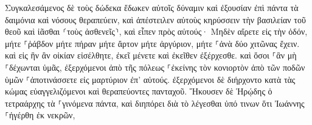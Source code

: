 \documentclass{openreader}
\begin{document}
Συγκαλεσάμενος δὲ τοὺς δώδεκα ἔδωκεν αὐτοῖς δύναμιν καὶ ἐξουσίαν ἐπὶ πάντα τὰ δαιμόνια καὶ νόσους θεραπεύειν, 
καὶ ἀπέστειλεν αὐτοὺς κηρύσσειν τὴν βασιλείαν τοῦ θεοῦ καὶ ἰᾶσθαι ⸂τοὺς ἀσθενεῖς⸃, 
καὶ εἶπεν πρὸς αὐτούς· Μηδὲν αἴρετε εἰς τὴν ὁδόν, μήτε ⸀ῥάβδον μήτε πήραν μήτε ἄρτον μήτε ἀργύριον, μήτε ⸀ἀνὰ δύο χιτῶνας ἔχειν. 
καὶ εἰς ἣν ἂν οἰκίαν εἰσέλθητε, ἐκεῖ μένετε καὶ ἐκεῖθεν ἐξέρχεσθε. 
καὶ ὅσοι ⸀ἂν μὴ ⸀δέχωνται ὑμᾶς, ἐξερχόμενοι ἀπὸ τῆς πόλεως ⸀ἐκείνης τὸν κονιορτὸν ἀπὸ τῶν ποδῶν ὑμῶν ⸀ἀποτινάσσετε εἰς μαρτύριον ἐπ’ αὐτούς. 
ἐξερχόμενοι δὲ διήρχοντο κατὰ τὰς κώμας εὐαγγελιζόμενοι καὶ θεραπεύοντες πανταχοῦ. 
Ἤκουσεν δὲ Ἡρῴδης ὁ τετραάρχης τὰ ⸀γινόμενα πάντα, καὶ διηπόρει διὰ τὸ λέγεσθαι ὑπό τινων ὅτι Ἰωάννης ⸀ἠγέρθη ἐκ νεκρῶν, 
\end{document}
